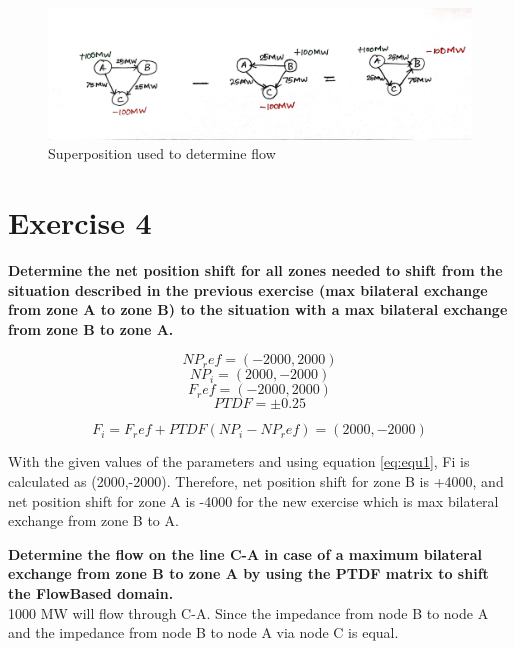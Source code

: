 \begin{enumerate}
    \begin{figure}[H]
    \centering
        \includegraphics[width=1 \linewidth]{power_flow.jpg}
        \caption{Superposition used to determine flow}
        \label{fig:pf}
\end{figure}

\end{enumerate}

\section*{\textbf{Exercise 4}}

\textbf{Determine the net position shift for all zones needed to shift from the situation described in the previous exercise (max bilateral exchange from zone A to zone B) to the situation with a max bilateral exchange from zone B to zone A.
}

\[NP_ref = (-2000,2000)\]
\[NP_i = (2000,-2000)\]
\[F_ref = (-2000,2000)\]
\[PTDF = \pm 0.25\]

\begin{equation}
    F_i = F_ref + PTDF(NP_i - NP_ref) = (2000,-2000)
    \label{eq:equ1}
\end{equation}

With the given values of the parameters and using equation \ref{eq:equ1}, Fi is calculated as (2000,-2000). Therefore, net position shift for zone B is +4000, and net position shift for zone A is -4000 for the new exercise which is max bilateral exchange from zone B to A.
\newline

\textbf{Determine the flow on the line C-A in case of a maximum bilateral exchange from zone B to zone A by using the PTDF matrix to shift the FlowBased domain. }\\
1000 MW will flow through C-A. Since the impedance from node B to node A and the impedance from node B to node A via node C is equal.
